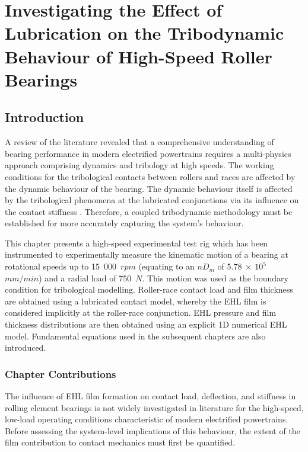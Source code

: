 \chapter{Investigating the Effect of Lubrication on the Tribodynamic Behaviour of High-Speed Roller Bearings}
\label{Investigating the Effect of Lubrication on the Tribodynamic Behaviour of High-Speed Roller Bearings}

\section{Introduction}

A review of the literature revealed that a comprehensive understanding of bearing performance in modern electrified powertrains requires a multi-physics approach comprising dynamics and tribology at high speeds. The working conditions for the tribological contacts between rollers and races are affected by the dynamic behaviour of the bearing. The dynamic behaviour itself is affected by the tribological phenomena at the lubricated conjunctions via its influence on the contact stiffness \cite{Nonato2014} \cite{Bizarre2018}. Therefore, a coupled tribodynamic methodology must be established for more accurately capturing the system’s behaviour.

This chapter presents a high-speed experimental test rig which has been instrumented to experimentally measure the kinematic motion of a bearing at rotational speeds up to 15~000~$rpm$ (equating to an $nD_m$ of 5.78$~\times~10^{5}$~$mm/min$) and a radial load of 750~$N$. This motion was used as the boundary condition for tribological modelling. Roller-race contact load and film thickness are obtained using a lubricated contact model, whereby the EHL film is considered implicitly at the roller-race conjunction. EHL pressure and film thickness distributions are then obtained using an explicit 1D numerical EHL model. Fundamental equations used in the subsequent chapters are also introduced.

\subsection{Chapter Contributions}

The influence of EHL film formation on contact load, deflection, and stiffness in rolling element bearings is not widely investigated in literature for the high-speed, low-load operating conditions characteristic of modern electrified powertrains. Before assessing the system-level implications of this behaviour, the extent of the film contribution to contact mechanics must first be quantified.

